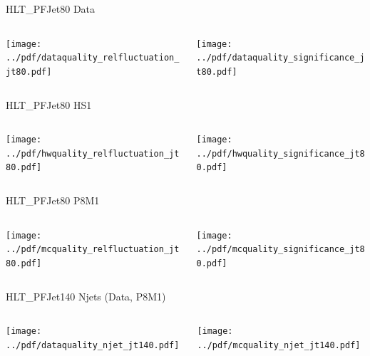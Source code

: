 \documentclass[9pt]{beamer}
\begin{document}
\begin{frame}[t]{HLT\_PFJet80 Data}
\begin{columns}[T]
  \begin{column}{.5\textwidth}
  \texttt{[image: ../pdf/dataquality\_relfluctuation\_jt80.pdf]}
  \end{column}
  \begin{column}{.5\textwidth}
  \texttt{[image: ../pdf/dataquality\_significance\_jt80.pdf]}
  \end{column}
\end{columns}
\end{frame}

\begin{frame}[t]{HLT\_PFJet80 HS1}
\begin{columns}[T]
  \begin{column}{.5\textwidth}
  \texttt{[image: ../pdf/hwquality\_relfluctuation\_jt80.pdf]}
  \end{column}
  \begin{column}{.5\textwidth}
  \texttt{[image: ../pdf/hwquality\_significance\_jt80.pdf]}
  \end{column}
\end{columns}
\end{frame}

\begin{frame}[t]{HLT\_PFJet80 P8M1}
\begin{columns}[T]
  \begin{column}{.5\textwidth}
  \texttt{[image: ../pdf/mcquality\_relfluctuation\_jt80.pdf]}
  \end{column}
  \begin{column}{.5\textwidth}
  \texttt{[image: ../pdf/mcquality\_significance\_jt80.pdf]}
  \end{column}
\end{columns}
\end{frame}


\begin{frame}[t]{HLT\_PFJet140 Njets (Data, P8M1)}
\begin{columns}[T]
  \begin{column}{.5\textwidth}
  \texttt{[image: ../pdf/dataquality\_njet\_jt140.pdf]}
  \end{column}
  \begin{column}{.5\textwidth}
  \texttt{[image: ../pdf/mcquality\_njet\_jt140.pdf]}
  \end{column}
\end{columns}
\end{frame}
\end{document}
